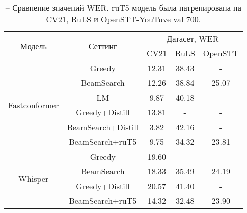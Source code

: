 \begin{table}[]
\centering
\caption{-- Сравнение значений WER. ruT5 модель была натренирована на CV21, RuLS и OpenSTT-YouTuve val 700.}
\begin{tabular}{|c|c|ccc|}
\hline
\multirow{2}{*}{Модель}        & \multirow{2}{*}{Сеттинг}             & \multicolumn{3}{c|}{Датасет, WER}                                    \\ \cline{3-5} 
                               &                                      & \multicolumn{1}{c|}{CV21}  & \multicolumn{1}{c|}{RuLS}     & OpenSTT \\ \hline
\multirow{6}{*}{Fastconformer} & Greedy                               & \multicolumn{1}{c|}{12.31} & \multicolumn{1}{c|}{38.43}    & -       \\ \cline{2-5} 
                               & BeamSearch                           & \multicolumn{1}{c|}{12.26} & \multicolumn{1}{c|}{38.84}    & 25.07       \\ \cline{2-5} 
                               & LM                                   & \multicolumn{1}{c|}{9.87}  & \multicolumn{1}{c|}{40.18}    & -       \\ \cline{2-5} 
                               & Greedy+Distill                       & \multicolumn{1}{c|}{13.81} & \multicolumn{1}{c|}{-}    & -       \\ \cline{2-5} 
                               & BeamSearch+Distill                   & \multicolumn{1}{c|}{3.82}  & \multicolumn{1}{c|}{42.16}    & -       \\ \cline{2-5} 
                               & BeamSearch+ruT5                      & \multicolumn{1}{c|}{9.75}  & \multicolumn{1}{c|}{34.32}    & 23.81       \\ \hline
\multirow{4}{*}{Whisper}       & Greedy                               & \multicolumn{1}{c|}{19.60} & \multicolumn{1}{c|}{-}    & -       \\ \cline{2-5} 
                               & BeamSearch                           & \multicolumn{1}{c|}{18.33} & \multicolumn{1}{c|}{35.49}    & 24.19       \\ \cline{2-5} 
                               & Greedy+Distill                       & \multicolumn{1}{c|}{20.57} & \multicolumn{1}{c|}{41.40}    & -       \\ \cline{2-5} 
                               & BeamSearch+ruT5                      & \multicolumn{1}{c|}{14.32} & \multicolumn{1}{c|}{32.48}    & 23.90       \\ \hline
\end{tabular}
\label{tab:res_full}
\end{table}

